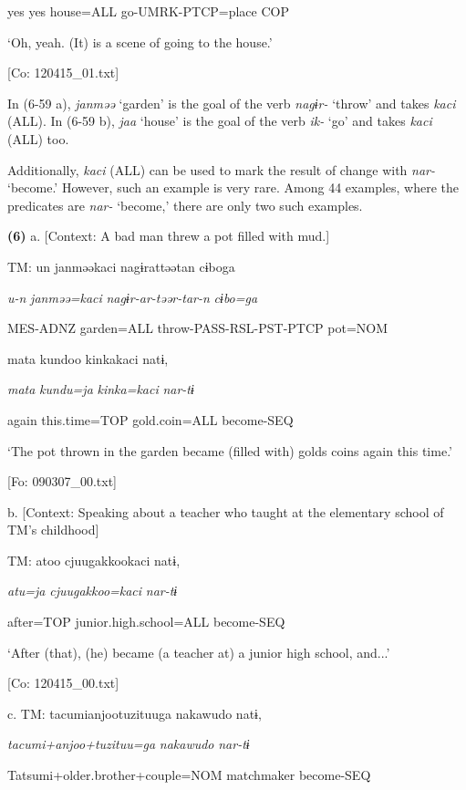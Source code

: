       yes  yes  house=ALL  go-UMRK-PTCP=place  COP

      ‘Oh, yeah. (It) is a scene of going to the house.’

      [Co: 120415\_01.txt]

In (6-59 a), \textit{janməə} ‘garden’ is the goal of the verb \textit{nagɨr-} ‘throw’ and takes \textit{kaci} (ALL). In (6-59 b), \textit{jaa} ‘house’ is the goal of the verb \textit{ik-} ‘go’ and takes \textit{kaci} (ALL) too.

Additionally, \textit{kaci} (ALL) can be used to mark the result of change with \textit{nar-} ‘become.’ However, such an example is very rare. Among 44 examples, where the predicates are \textit{nar-} ‘become,’ there are only two such examples.

\textbf{(6)}  a.  [Context: A bad man threw a pot filled with mud.]

    TM:  un  janməəkaci  nagɨrattəətan  cɨboga

      \textit{u-n}  \textit{janməə=kaci}  \textit{nagɨr-ar-təər-tar-n}  \textit{cɨbo=ga}

      MES-ADNZ  garden=ALL  throw-PASS-RSL-PST-PTCP  pot=NOM

      mata  kundoo  kinkakaci  natɨ,

      \textit{mata}  \textit{kundu=ja}  \textit{kinka=kaci}  \textit{nar{}-tɨ}

      again  this.time=TOP  gold.coin=ALL  become-SEQ

      ‘The pot thrown in the garden became (filled with) golds coins again this time.’

      [Fo: 090307\_00.txt]

  b.  [Context: Speaking about a teacher who taught at the elementary school of TM’s childhood]

    TM:  atoo  cjuugakkookaci  natɨ,

      \textit{atu=ja}  \textit{cjuugakkoo=kaci}  \textit{nar{}-tɨ}

      after=TOP  junior.high.school=ALL  become-SEQ

      ‘After (that), (he) became (a teacher at) a junior high school, and...’

      [Co: 120415\_00.txt]

  c.  TM:  tacumianjootuzituuga  nakawudo  natɨ,

      \textit{tacumi+anjoo+tuzituu=ga}  \textit{nakawudo}  \textit{nar{}-tɨ}

      Tatsumi+older.brother+couple=NOM  matchmaker  become-SEQ


